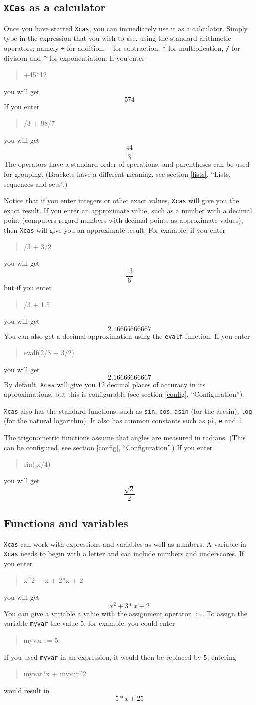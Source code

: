 \documentclass{article}
\newcommand{\xcasin}[1]
{\begin{quote}\ttfamily
#1
\end{quote}}
\newcommand{\xcasout}[1]
{\begin{equation*}
#1
\end{equation*}}
\begin{document}
\subsection{\texttt{XCas} as a calculator}

Once you have started \texttt{Xcas}, you can immediately use it as a
calculator.  Simply type in the expression that you wish to
use, using the standard arithmetic operators; namely \texttt{+} for
addition, \texttt{-} for subtraction, \texttt{*} for multiplication,
\texttt{/} for division and \texttt{\^{}} for exponentiation.
If you enter
\xcasin{34+45*12}
you will get
\xcasout{574}
If you enter
\xcasin{2/3 + 98/7}
you will get
\xcasout{\frac{44}{3}}
The operators have a standard order of operations, and parentheses
can be used for grouping.  (Brackets have a different meaning, see
section \ref{lists}, ``Lists, sequences and sets''.)

Notice that if you enter integers or other exact values,
\texttt{Xcas} will give you the exact result.  If you enter an
approximate value, such as a number with a decimal point (computers
regard numbers with decimal points as approximate values), then
\texttt{Xcas} will give you an approximate result.  For example, if
you enter
\xcasin{2/3 + 3/2}
you will get
\xcasout{\frac{13}{6}}
but if you enter
\xcasin{2/3 + 1.5}
you will get
\xcasout{2.16666666667}
You can also get a decimal approximation using the \texttt{evalf}
function.  If you enter
\xcasin{evalf(2/3 + 3/2)}
you will get
\xcasout{2.16666666667}
By default, \texttt{Xcas} will give you 12 decimal places of accuracy
in its approximations, but this is configurable (see section
\ref{config}, ``Configuration'').

\texttt{Xcas} also has the standard functions, such as
\texttt{sin}, \texttt{cos}, \texttt{asin} (for the arcsin),
\texttt{log} (for the natural logarithm).
It also has common constants such as \texttt{pi}, \texttt{e} and \texttt{i}.

The trigonometric functions assume that angles are measured in
radians.  (This can be configured, see section \ref{config},
``Configuration''.)  If you enter
\xcasin{sin(pi/4)}
you will get
\xcasout{\frac{\sqrt{2}}{2}}

\subsection{Functions and variables}

\texttt{Xcas} can work with expressions and variables as well as numbers.
A variable in \texttt{Xcas} needs to begin with a letter and can
include numbers and underscores. If you enter
\xcasin{x\^{}2 + x + 2*x + 2}
you will get
\xcasout{x^2 + 3*x + 2}
You can give a variable a value with the assignment operator,
\texttt{:=}.  To assign the variable \texttt{myvar} the value 5, for
example, you could enter
\xcasin{myvar := 5}
If you used \texttt{myvar} in an expression, it would then be replaced
by \texttt{5}; entering
\xcasin{myvar*x + myvar\^{}2}
would result in
\xcasout{5*x + 25}
\end{document}
